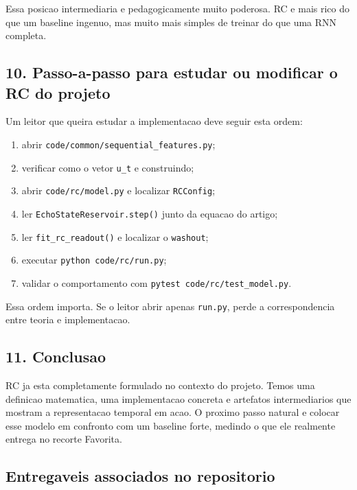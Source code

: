 \documentclass[12pt]{article}
\providecommand{\tightlist}{%
          \setlength{\itemsep}{0pt}\setlength{\parskip}{0pt}}
\begin{document}
Essa posicao intermediaria e pedagogicamente muito poderosa. RC e mais rico do que um baseline ingenuo, mas muito mais simples de treinar do que uma RNN completa.

\subsection{10. Passo-a-passo para estudar ou modificar o RC do projeto}\label{10-passo-a-passo-para-estudar-ou-modificar-o-rc-do-projeto}

Um leitor que queira estudar a implementacao deve seguir esta ordem:

\begin{enumerate}
\def\labelenumi{\arabic{enumi}.}
\tightlist
\item
  abrir \texttt{code/common/sequential\_features.py};
\item
  verificar como o vetor \texttt{u\_t} e construindo;
\item
  abrir \texttt{code/rc/model.py} e localizar \texttt{RCConfig};
\item
  ler \texttt{EchoStateReservoir.step()} junto da equacao do artigo;
\item
  ler \texttt{fit\_rc\_readout()} e localizar o \texttt{washout};
\item
  executar \texttt{python\ code/rc/run.py};
\item
  validar o comportamento com \texttt{pytest\ code/rc/test\_model.py}.
\end{enumerate}

Essa ordem importa. Se o leitor abrir apenas \texttt{run.py}, perde a correspondencia entre teoria e implementacao.

\subsection{11. Conclusao}\label{11-conclusao}

RC ja esta completamente formulado no contexto do projeto. Temos uma definicao matematica, uma implementacao concreta e artefatos intermediarios que mostram a representacao temporal em acao. O proximo passo natural e colocar esse modelo em confronto com um baseline forte, medindo o que ele realmente entrega no recorte Favorita.

\subsection{Entregaveis associados no repositorio}\label{entregaveis-associados-no-repositorio}
\end{document}
